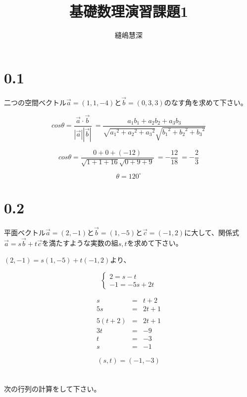 \documentclass{jsarticle}
\title{基礎数理演習課題1}
\author{縫嶋慧深}
\begin{document}
	\maketitle

	\section*{0.1}
	二つの空間ベクトル$\overrightarrow{a}= (1, 1, -4)$と$\overrightarrow{b}= (0, 3, 3)$のなす角を求めて下さい。

	\[
		cos\theta
			= \frac {\overrightarrow{a} \cdot \overrightarrow{b}}
				{|\overrightarrow{a}| |\overrightarrow{b}|}\
			= \frac {a_1b_1+a_2b_2+a_3b_3}
				{\sqrt {{a_1}^2+{a_2}^2+{a_3}^2} \sqrt {{b_1}^2+{b_2}^2+{b_3}^2}}
	\]

	\[
		cos\theta
			= \frac {0 + 0 + (-12)} {\sqrt {1 + 1 + 16} \sqrt {0 + 9 + 9}}\
			= - \frac {12}{18}\
			= - \frac{2}{3}
	\]

	\[
		\theta = 120^\circ
	\]

	\section*{0.2}
	平面ベクトル$\overrightarrow{a}= (2, -1)$と$\overrightarrow{b}= (1, -5)$と$\overrightarrow{c}= (-1, 2)$に大して、関係式$\overrightarrow{a} = s\overrightarrow{b} + t\overrightarrow{c}$を満たすような実数の組$s, t$を求めて下さい。

	$(2, -1) = s(1, -5) + t(-1, 2)$より、

	\[
		\begin{cases}
			2 = s - t \\
			-1 = -5s + 2t
		\end{cases}
	\]

	\begin{eqnarray*}
		s &=& t + 2 \\
		5s &=& 2t + 1 \\
		\\
		5(t + 2) &=& 2t + 1 \\
		3t &=& -9 \\
		t &=& -3 \\
		s &=& -1
	\end{eqnarray*}

	\[
		(s, t) = (-1, -3)
	\]

	\section{}
	次の行列の計算をして下さい。
\end{document}
